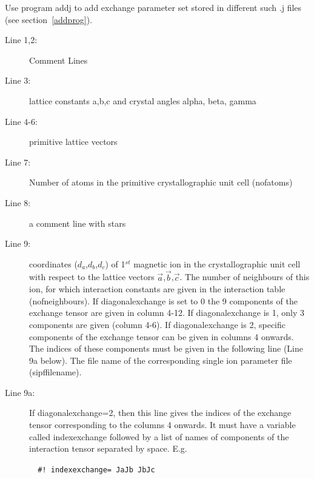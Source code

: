 Use program {\prg addj} to add exchange parameter set stored in different 
such {\prg .j} files (see section~\ref{addprog}).



\begin{description}
\item [Line 1,2:] Comment Lines
\item [Line 3:] lattice constants a,b,c and crystal angles alpha, beta, gamma 
\item [Line 4-6:] primitive lattice vectors
\item [Line 7:] Number of atoms in the primitive crystallographic unit cell ({\prg nofatoms})
\item [Line 8:] a comment line with stars
\item [Line 9:] coordinates  ($d_a$,$d_b$,$d_c$) of 1$^{st}$ magnetic ion in the crystallographic unit cell  with
respect to the lattice vectors $\vec a$,$\vec b$,$\vec c$. The number of neighbours of this 
ion, for which interaction constants are given in the interaction table (nofneighbours). 
If {\prg diagonalexchange}
is set to 0 the 9 components of the exchange tensor are given in column 4-12. 
If {\prg diagonalexchange}
 is 1, only 3 components are given (column 4-6).
If {\prg diagonalexchange}
 is 2, specific components of the exchange tensor can be given in columns 4 onwards. The indices of these components
 must be given in the following line (Line 9a below).
The file name of the corresponding single ion
parameter file (sipffilename).
\item [Line 9a:]  If {\prg diagonalexchange=2}, then this line gives the indices of the exchange tensor corresponding to 
 the columns 4 onwards. It must have a variable called {\prg indexexchange} followed by a list of names of components of the interaction
 tensor separated by space. E.g.

 \verb|  #! indexexchange= JaJb JbJc  | 


\end{description}

